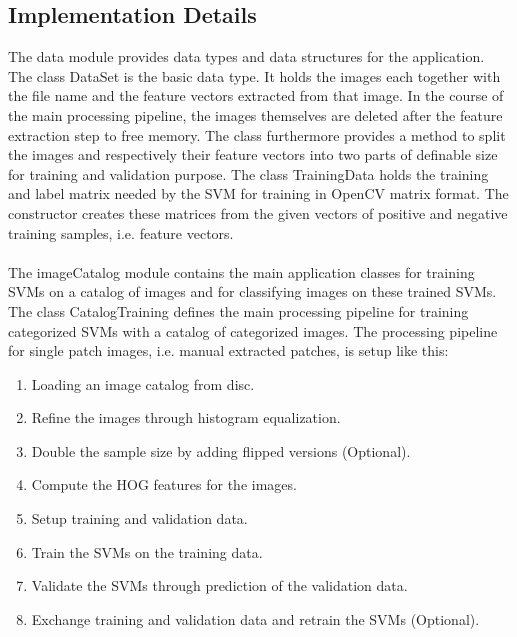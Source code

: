 \subsection{Implementation Details}

The data module provides data types and data structures for the application. The class DataSet is the basic data type. It holds the images each together with the file name and the feature vectors extracted from that image. In the course of the main processing pipeline, the images themselves are deleted after the feature extraction step to free memory. The class furthermore provides a method to split the images and respectively their feature vectors into two parts of definable size for training and validation purpose. The class TrainingData holds the training and label matrix needed by the SVM for training in OpenCV matrix format. The constructor creates these matrices from the given vectors of positive and negative training samples, i.e. feature vectors.
\\
\\
The imageCatalog module contains the main application classes for training SVMs on a catalog of images and for classifying images on these trained SVMs. The class CatalogTraining defines the main processing pipeline for training categorized SVMs with a catalog of categorized images. The processing pipeline for single patch images, i.e. manual extracted patches, is setup like this:

\begin{enumerate}
	\item Loading an image catalog from disc.
	\item Refine the images through histogram equalization.
	\item Double the sample size by adding flipped versions (Optional).
	\item Compute the HOG features for the images.
	\item Setup training and validation data.
	\item Train the SVMs on the training data.
	\item Validate the SVMs through prediction of the validation data.
	\item Exchange training and validation data and retrain the SVMs (Optional).
\end{enumerate}


